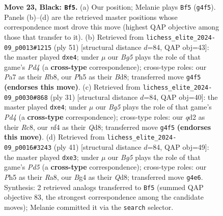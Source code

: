 \documentclass[11pt]{article}
\begin{document}
\begin{figure}[p]
\caption{\textbf{Move 23, Black: \texttt{Bf5}.} (a) Our position; Melanie plays \texttt{Bf5} (\texttt{g4f5}). Panels (b)--(d) are the retrieved master positions whose correspondence most drove this move (highest QAP objective among those that transfer to it). (b) Retrieved from \texttt{lichess\_elite\_2024-09\_p0013\#1215} (ply 51) [structural distance $d$=84, QAP obj=43]: the master played \texttt{dxe4}; under $\mu$ our \emph{Bg5} plays the role of that game's \emph{Pd4} (a \textbf{cross-type} correspondence); cross-type roles: our \emph{P}a7 as their \emph{R}b8, our \emph{P}h5 as their \emph{B}d8; transferred move \texttt{g4f5} \textbf{(endorses this move)}. (c) Retrieved from \texttt{lichess\_elite\_2024-09\_p0030\#868} (ply 31) [structural distance $d$=84, QAP obj=40]: the master played \texttt{dxe4}; under $\mu$ our \emph{Bg5} plays the role of that game's \emph{Pd4} (a \textbf{cross-type} correspondence); cross-type roles: our \emph{q}d2 as their \emph{R}c8, our \emph{n}f4 as their \emph{Q}d8; transferred move \texttt{g4f5} \textbf{(endorses this move)}. (d) Retrieved from \texttt{lichess\_elite\_2024-09\_p0016\#3243} (ply 41) [structural distance $d$=84, QAP obj=49]: the master played \texttt{dxe3}; under $\mu$ our \emph{Bg5} plays the role of that game's \emph{Pd5} (a \textbf{cross-type} correspondence); cross-type roles: our \emph{P}h5 as their \emph{R}a8, our \emph{B}g4 as their \emph{Q}d8; transferred move \texttt{g4e6}. Synthesis: 2 retrieved analogs transferred to \texttt{Bf5} (summed QAP objective 83, the strongest correspondence among the candidate moves); Melanie committed it via the \texttt{search} selector.}
\label{fig:thought-m45}
\end{figure}

\clearpage
\end{document}
